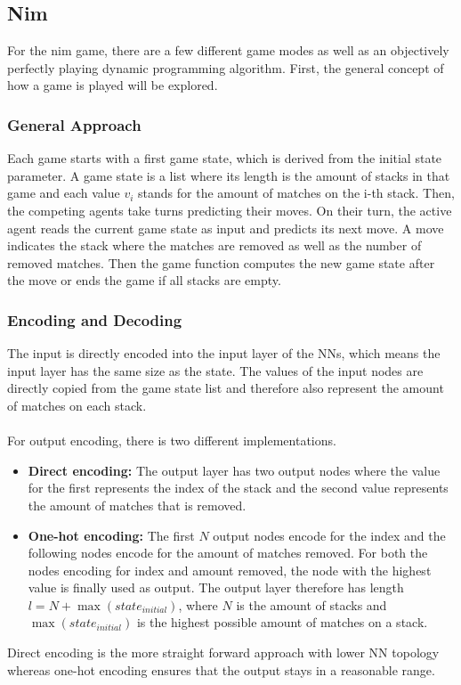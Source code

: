 \documentclass[11pt]{report}
\begin{document}
\begin{enumerate}
    \subsection{Nim}\label{subsec:nim-implementation}
    For the nim game, there are a few different game modes as well as an objectively perfectly playing dynamic programming algorithm.
    First, the general concept of how a game is played will be explored.

    \subsubsection{General Approach}
    Each game starts with a first game state, which is derived from the initial state parameter.
    A game state is a list where its length is the amount of stacks in that game and each value $v_i$ stands for the amount of matches on the i-th stack.
    Then, the competing agents take turns predicting their moves.
    On their turn, the active agent reads the current game state as input and predicts its next move.
    A move indicates the stack where the matches are removed as well as the number of removed matches.
    Then the game function computes the new game state after the move or ends the game if all stacks are empty.

    \subsubsection{Encoding and Decoding}
    The input is directly encoded into the input layer of the NNs, which means the input layer has the same size as the state.
    The values of the input nodes are directly copied from the game state list and therefore also represent the amount of matches on each stack.
    \\ \\
    For output encoding, there is two different implementations.
    \begin{itemize}
        \item \textbf{Direct encoding:} The output layer has two output nodes where the value for the first represents the index of the stack and the second value represents the amount of matches that is removed.
        \item \textbf{One-hot encoding:} The first $N$ output nodes encode for the index and the following nodes encode for the amount of matches removed.
        For both the nodes encoding for index and amount removed, the node with the highest value is finally used as output.
        The output layer therefore has length $l = N + \max(state_{initial})$, where $N$ is the amount of stacks and $\max(state_{initial})$ is the highest possible amount of matches on a stack.
    \end{itemize}
    Direct encoding is the more straight forward approach with lower NN topology whereas one-hot encoding ensures that the output stays in a reasonable range.


\end{enumerate}
\end{document}
